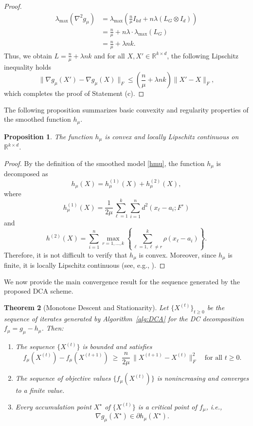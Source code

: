 \documentclass[11pt]{article}
\newtheorem{theorem}{Theorem}[section]
\newtheorem{proposition}[theorem]{Proposition}
\theoremstyle{definition}
\newcommand{\1}{\mathbf{1}}
\begin{document}
\begin{proof}
\begin{align*}
\lambda_{\max}(\nabla^2 g_\mu) &= \lambda_{\max} \left( \frac{n}{\mu} I_{kd} + n\lambda (L_G \otimes I_d) \right) \\
&= \frac{n}{\mu} + n\lambda \cdot \lambda_{\max}(L_G) \\
&= \frac{n}{\mu} + \lambda n k.
\end{align*}
Thus, we obtain $L = \frac{n}{\mu} + \lambda n k$ and for all $X, X' \in \mathbb{R}^{k \times d}$, the following Lipschitz inequality holds
\begin{equation*}
\|\nabla g_\mu(X') - \nabla g_\mu(X)\|_F \le \left( \frac{n}{\mu} + \lambda n k \right) \|X' - X\|_F,
\end{equation*}
which completes the proof of Statement (c).
\end{proof}


The following proposition summarizes basic convexity and regularity properties of the smoothed function $h_\mu.$
\begin{proposition}
\label{pro:hconvex-special}
The function $h_\mu$ is convex and locally Lipschitz continuous on $\mathbb{R}^{k\times d}$.  
\end{proposition} 

\begin{proof}
By the definition of the smoothed model \eqref{hmu}, the function $h_\mu$ is decomposed as $$h_\mu(X) = h_\mu^{(1)}(X) + h_\mu^{(2)}(X),$$ 
where
\[ h_\mu^{(1)}(X) = \frac{1}{2\mu} \sum_{\ell=1}^k \sum_{i=1}^n d^2(x_\ell - a_i; F^\circ) \]
and
\[ h^{(2)}(X) = \sum_{i=1}^n \max_{r=1,\dots,k} \left\{ \sum_{\ell=1, \ell \neq r}^k \rho(x_\ell - a_i) \right\}. \]
Therefore, it is not difficult to verify that $h_\mu$ is convex. Moreover, since $h_\mu$ is finite, it is locally Lipschitz continuous (see, e.g., \cite[Corollary~1.63]{mordukhovich2023easy}).
\end{proof}


We now provide the main convergence result for the sequence generated by the proposed DCA scheme.

\begin{theorem}[Monotone Descent and Stationarity] \label{thm:dca-convergence-special}
Let $\{X^{(t)}\}_{t\ge0}$ be the sequence of iterates generated by Algorithm~\ref{alg:DCA}
for the DC decomposition $f_\mu = g_\mu - h_\mu$. Then:
\begin{enumerate}
\item[{\rm (a)}] The sequence $\{X^{(t)}\}$ is bounded and satisfies
\[
f_\mu(X^{(t)}) - f_\mu(X^{(t+1)}) \;\ge\; \frac{n}{2\mu} \,\|X^{(t+1)} - X^{(t)}\|_F^2
\quad\text{for all } t\ge 0.
\]
\item[{\rm (b)}] The sequence of objective values $\{f_\mu(X^{(t)})\}$ is nonincreasing and converges to a finite value.
\item[{\rm (c)}] Every accumulation point $X^\star$ of $\{X^{(t)}\}$ is a critical point of $f_\mu$, i.e.,
\[
\nabla g_\mu(X^\star) \in \partial h_\mu(X^\star).
\]
\end{enumerate}
\end{theorem}
\end{document}
